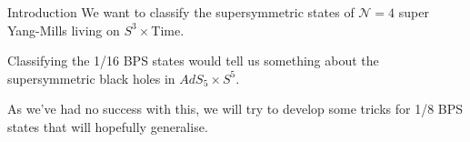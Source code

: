 \documentclass[%
ps,accumulate,
colorBG, slideColor,
total,
serpaggi
%
]{prosper}
\newcommand{\CN}{\mathcal{N}}
\newcommand{\ad}{{\dot{\alpha}}}
\newcommand{\Qb}{{\overline Q}}
\newcommand{\Sb}{{\overline S}}
\newcommand{\bR}{\mathbb{R}}
\begin{document}
%
%
%
%
%
%
%
%
%
%
%
%


\begin{slide}{Introduction}
%
 We want to classify the supersymmetric states of $\CN=4$ super
 Yang-Mills living on $S^3\times$Time.

 \vp Classifying the 1/16 BPS states would tell us something about
 the supersymmetric black holes in $AdS_5\times S^5$.

 \vp As we've had no success with this, we will try to develop some
 tricks for 1/8 BPS states that will hopefully generalise.
%
\end{slide}
\end{document}
